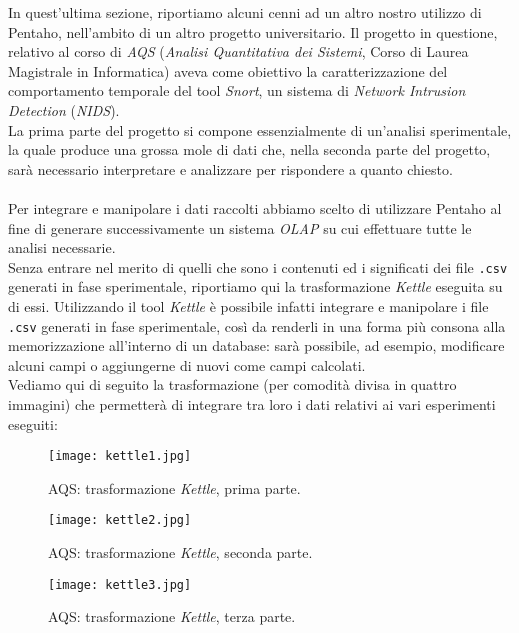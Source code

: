 		In quest'ultima sezione, riportiamo alcuni cenni ad un altro nostro utilizzo di Pentaho, nell'ambito di un altro progetto universitario. Il progetto in questione, relativo al corso di \textit{AQS} (\textit{Analisi Quantitativa dei Sistemi}, Corso di Laurea Magistrale in Informatica) aveva come obiettivo la caratterizzazione del comportamento temporale del tool \textit{Snort}, un sistema di \textit{Network Intrusion Detection} (\textit{NIDS}).\\
		La prima parte del progetto si compone essenzialmente di un'analisi sperimentale, la quale produce una grossa mole di dati che, nella seconda parte del progetto, sarà necessario interpretare e analizzare per rispondere a quanto chiesto.\\
		\\
		Per integrare e manipolare i dati raccolti abbiamo scelto di utilizzare Pentaho al fine di generare successivamente un sistema \textit{OLAP} su cui effettuare tutte le analisi necessarie.\\
		Senza entrare nel merito di quelli che sono i contenuti ed i significati dei file \texttt{.csv} generati in fase sperimentale, riportiamo qui la trasformazione \textit{Kettle} eseguita su di essi. Utilizzando il tool \textit{Kettle} è possibile infatti integrare e manipolare i file \texttt{.csv} generati in fase sperimentale, così da renderli in una forma più consona alla memorizzazione all'interno di un database: sarà possibile, ad esempio, modificare alcuni campi o aggiungerne di nuovi come campi calcolati.\\
		Vediamo qui di seguito la trasformazione (per comodità divisa in quattro immagini) che permetterà di integrare tra loro i dati relativi ai vari esperimenti eseguiti:
		
		\begin{figure}[h!]
			\centering
			\texttt{[image: kettle1.jpg]}
			\caption{AQS: trasformazione \textit{Kettle}, prima parte.}
			\label{fig:kettle1}
		\end{figure}
	
	    \begin{figure}[h!]
			\centering
			\texttt{[image: kettle2.jpg]}
			\caption{AQS: trasformazione \textit{Kettle}, seconda parte.}
			\label{fig:kettle2}
		\end{figure}
	
	    \begin{figure}[h!]
			\centering
			\texttt{[image: kettle3.jpg]}
			\caption{AQS: trasformazione \textit{Kettle}, terza parte.}
			\label{fig:kettle3}
		\end{figure}
	
